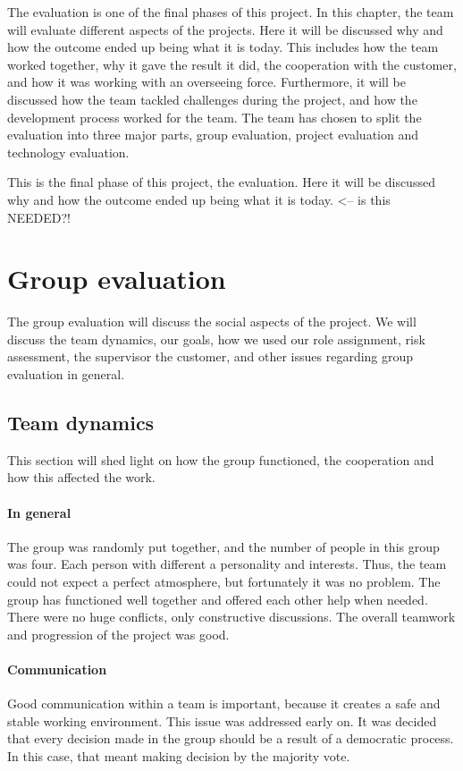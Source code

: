 The evaluation is one of the final phases of this project. In this chapter, the team will evaluate different aspects of the projects. 
Here it will be discussed why and how the outcome ended up being what it is today.
This includes how the team worked together, why it gave the result it did, the cooperation with the customer, and how it was working with an overseeing force. 
Furthermore, it will be discussed how the team tackled challenges during the project, and how the development process worked for the team.
The team has chosen to split the evaluation into three major parts, group evaluation, project evaluation and technology evaluation. 
 
This is the final phase of this project, the evaluation. Here it will be discussed why and how the outcome
ended up being what it is today.  <-- is this NEEDED?!
\section{Group evaluation}
The group evaluation will discuss the social aspects of the project. 
We will discuss the team dynamics, our goals, how we used our role assignment, risk assessment, the supervisor the customer, and other issues regarding group evaluation in general.

\subsection{Team dynamics}
This section will shed light on how the group functioned, the cooperation and how this affected the work.

\paragraph{In general}
The group was randomly put together, and the number of people in this group was four.
Each person with different a personality and interests. Thus, the team could not expect a perfect atmosphere, but fortunately it was no problem. 
The group has functioned well together and offered each other help when needed. There were no huge conflicts, only constructive discussions. 
The overall teamwork and progression of the project was good.

\paragraph{Communication}
Good communication within a team is important, because it creates a safe and stable working
environment. This issue was addressed early on. It was decided that every decision made in the group should be a result of a democratic process. In this case, that meant making decision by the majority vote.

